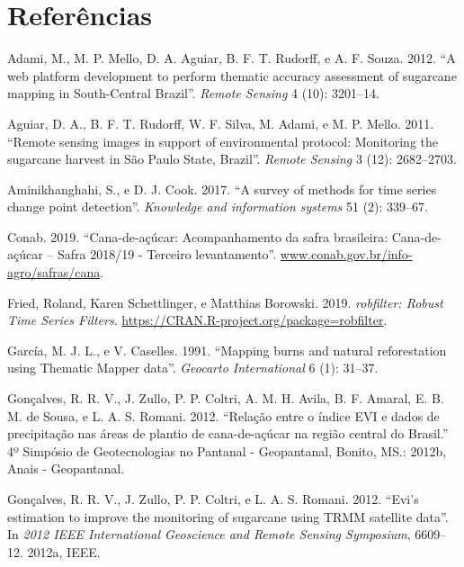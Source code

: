\documentclass[11pt,brazil,]{article}
\begin{document}
\newpage

\hypertarget{referencias}{%
\section*{Referências}\label{referencias}}

\hypertarget{refs}{}
\leavevmode\hypertarget{ref-sugarcanesouth}{}%
Adami, M., M. P. Mello, D. A. Aguiar, B. F. T. Rudorff, e A. F. Souza.
2012. ``A web platform development to perform thematic accuracy
assessment of sugarcane mapping in South-Central Brazil''. \emph{Remote
Sensing} 4 (10): 3201--14.

\leavevmode\hypertarget{ref-aguiar2011remote}{}%
Aguiar, D. A., B. F. T. Rudorff, W. F. Silva, M. Adami, e M. P. Mello.
2011. ``Remote sensing images in support of environmental protocol:
Monitoring the sugarcane harvest in São Paulo State, Brazil''.
\emph{Remote Sensing} 3 (12): 2682--2703.

\leavevmode\hypertarget{ref-aminikhanghahi2017survey}{}%
Aminikhanghahi, S., e D. J. Cook. 2017. ``A survey of methods for time
series change point detection''. \emph{Knowledge and information
systems} 51 (2): 339--67.

\leavevmode\hypertarget{ref-conab}{}%
Conab. 2019. ``Cana-de-açúcar: Acompanhamento da safra brasileira:
Cana-de-açúcar -- Safra 2018/19 - Terceiro levantamento''.
\url{www.conab.gov.br/info-agro/safras/cana}.

\leavevmode\hypertarget{ref-robfilter}{}%
Fried, Roland, Karen Schettlinger, e Matthias Borowski. 2019.
\emph{robfilter: Robust Time Series Filters}.
\url{https://CRAN.R-project.org/package=robfilter}.

\leavevmode\hypertarget{ref-garcia1991mapping}{}%
García, M. J. L., e V. Caselles. 1991. ``Mapping burns and natural
reforestation using Thematic Mapper data''. \emph{Geocarto
International} 6 (1): 31--37.

\leavevmode\hypertarget{ref-gonccalves2012relaccao}{}%
Gonçalves, R. R. V., J. Zullo, P. P. Coltri, A. M. H. Avila, B. F.
Amaral, E. B. M. de Sousa, e L. A. S. Romani. 2012. ``Relação entre o
índice EVI e dados de precipitação nas áreas de plantio de
cana-de-açúcar na região central do Brasil.'' 4º Simpósio de
Geotecnologias no Pantanal - Geopantanal, Bonito, MS.: 2012b, Anais -
Geopantanal.

\leavevmode\hypertarget{ref-gonccalves2012evi}{}%
Gonçalves, R. R. V., J. Zullo, P. P. Coltri, e L. A. S. Romani. 2012.
``Evi's estimation to improve the monitoring of sugarcane using TRMM
satellite data''. In \emph{2012 IEEE International Geoscience and Remote
Sensing Symposium}, 6609--12. 2012a, IEEE.
\end{document}
